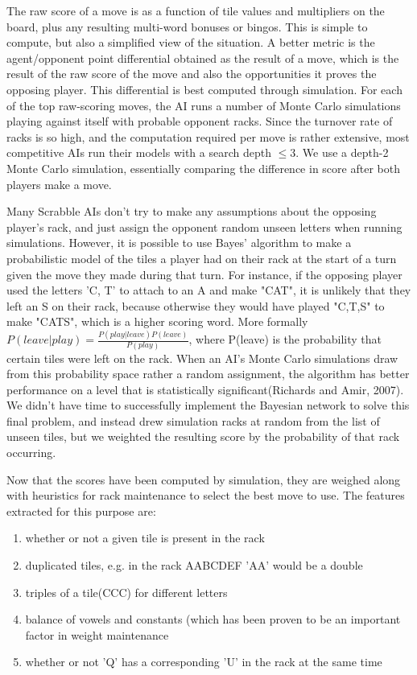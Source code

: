 \documentclass[12pt]{article}
\begin{document}
The raw score of a move is as a function of tile values and
multipliers on the board, plus any resulting multi-word bonuses or
bingos. This is simple to compute, but also a simplified view of the
situation. A better metric is the agent/opponent point differential
obtained as the result of a move, which is the result of the raw score
of the move and also the opportunities it proves the opposing
player. This differential is best computed through simulation. For
each of the top raw-scoring moves, the AI runs a number of Monte Carlo
simulations playing against itself with probable opponent racks. Since
the turnover rate of racks is so high, and the computation required
per move is rather extensive, most competitive AIs run their models
with a search depth $\leq 3$. We use a depth-2 Monte Carlo simulation,
essentially comparing the difference in score after both players make
a move.

Many Scrabble AIs don't try to make any assumptions about the opposing
player's rack, and just assign the opponent random unseen letters when
running simulations. However, it is possible to use Bayes' algorithm
to make a probabilistic model of the tiles a player had on their rack
at the start of a turn given the move they made during that turn.%
For instance, if the opposing player used the letters 'C, T' to attach
to an A and make "CAT", it is unlikely that they left an S on their
rack, because otherwise they would have played "C,T,S" to make "CATS",
which is a higher scoring word. More formally $P(leave | play) =
\frac{P(play | leave)P(leave)}{P(play)}$, where P(leave) is the
probability that certain tiles were left on the rack. When an AI's
Monte Carlo simulations draw from this probability space rather a
random assignment, the algorithm has better performance on a level
that is statistically significant(Richards and Amir, 2007). We didn't
have time to successfully implement the Bayesian network to solve this
final problem, and instead drew simulation racks at random from the
list of unseen tiles, but we weighted the resulting score by the
probability of that rack occurring.

	
Now that the scores have been computed by simulation, they are weighed
along with heuristics for rack maintenance to select the best move to
use. The features extracted for this purpose are:

\begin{enumerate}
  \item whether or not a given tile is present in the rack
  \item duplicated tiles, e.g. in the rack AABCDEF 'AA' would be a double
  \item triples of a tile(CCC) for different letters
  \item balance of vowels and constants (which has been proven to be
    an important factor in weight maintenance
  \item whether or not 'Q' has a corresponding 'U' in the rack at the same time
\end{enumerate}
\end{document}

